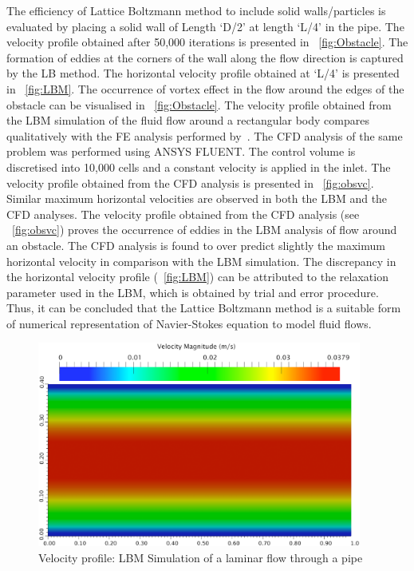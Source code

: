 The efficiency of Lattice Boltzmann method to include solid walls/particles is evaluated by placing a solid wall of Length `D/2' at length `L/4' in the pipe. The velocity profile obtained after 50,000 iterations is presented in ~\cref{fig:Obstacle}. The formation of eddies at the corners of the wall along the flow direction is captured by the LB method. The horizontal velocity profile obtained at `L/4' is presented in ~\cref{fig:LBM}. The occurrence of vortex effect in the flow around the edges of the obstacle can be visualised in ~\cref{fig:Obstacle}. The velocity profile obtained from the LBM simulation of the fluid flow around a rectangular body compares qualitatively with the FE analysis performed by~\citet{Zhong1991}. The CFD analysis of the same problem was performed using ANSYS FLUENT. The control volume is discretised into 10,000 cells and a constant velocity is applied in the inlet. The velocity profile obtained from the CFD analysis is presented in ~\cref{fig:obsvc}. Similar maximum horizontal velocities are observed in both the LBM and the CFD analyses. The velocity profile obtained from the CFD analysis (see ~\cref{fig:obsvc}) proves the occurrence of eddies in the LBM analysis of flow around an obstacle. The CFD analysis is found to over predict slightly the maximum horizontal velocity in comparison with the LBM simulation. The discrepancy in the horizontal velocity profile (~\cref{fig:LBM}) can be attributed to the relaxation parameter used in the LBM, which is obtained by trial and error procedure. Thus, it can be concluded that the Lattice Boltzmann method is a suitable form of numerical representation of Navier-Stokes equation to model fluid flows. 
\begin{figure}[h]
\centering
\includegraphics[width=0.95\textwidth]{LBM_Poiseuille}
\caption{Velocity profile: LBM Simulation of a laminar flow through a pipe}
\label{fig:LBM_Poiseuille}
\end{figure}

